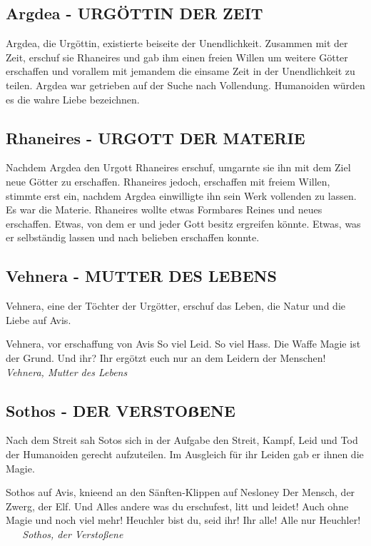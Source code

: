 \subsection{Argdea - URGÖTTIN DER ZEIT}
Argdea, die Urgöttin, existierte beiseite der Unendlichkeit. Zusammen mit der Zeit, erschuf sie Rhaneires und gab ihm einen freien Willen um weitere Götter erschaffen und vorallem mit jemandem die einsame Zeit in der Unendlichkeit zu teilen. Argdea war getrieben auf der Suche nach Vollendung. Humanoiden würden es die wahre Liebe bezeichnen.

\subsection{Rhaneires - URGOTT DER MATERIE}
Nachdem Argdea den Urgott Rhaneires erschuf, umgarnte sie ihn mit dem Ziel neue Götter zu erschaffen. Rhaneires jedoch, erschaffen mit freiem Willen, stimmte erst ein, nachdem Argdea einwilligte ihn sein Werk vollenden zu lassen. Es war die Materie. Rhaneires wollte etwas Formbares Reines und neues erschaffen. Etwas, von dem er und jeder Gott besitz ergreifen könnte. Etwas, was er selbständig lassen und nach belieben erschaffen konnte.

\subsection{Vehnera - MUTTER DES LEBENS}
Vehnera, eine der Töchter der Urgötter, erschuf das Leben, die Natur und die Liebe auf Avis.
\begin{DndSidebar}{Vehnera, vor erschaffung von Avis}
  So viel Leid. So viel Hass. Die Waffe Magie ist der Grund. Und ihr? Ihr ergötzt euch nur an dem Leidern der Menschen! \newline
  ~ ~ \textit{Vehnera, Mutter des Lebens}
\end{DndSidebar}


\subsection{Sothos - DER VERSTOẞENE}
Nach dem Streit sah Sotos sich in der Aufgabe den Streit, Kampf, Leid und Tod der Humanoiden gerecht aufzuteilen. Im Ausgleich für ihr Leiden gab er ihnen die Magie.
\begin{DndSidebar}{Sothos auf Avis, knieend an den Sänften-Klippen auf Nesloney}
  Der Mensch, der Zwerg, der Elf. Und Alles andere was du erschufest, litt und leidet! Auch ohne Magie und noch viel mehr!  Heuchler bist du, seid ihr! Ihr alle! Alle nur Heuchler! \newline
  ~ ~ \textit{Sothos, der Verstoßene}
\end{DndSidebar}

